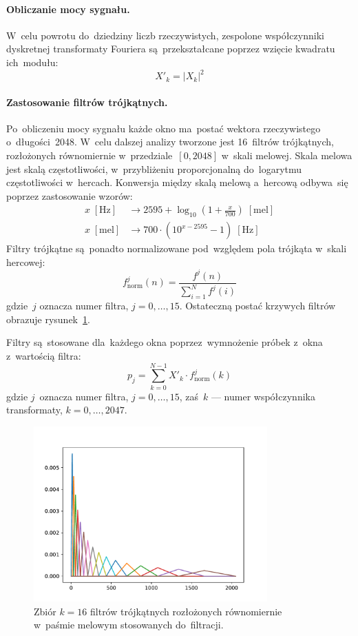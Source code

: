 \documentclass[11pt,a4paper]{article}
\begin{document}
\paragraph{Obliczanie mocy sygnału.}
W~celu powrotu do~dziedziny liczb rzeczywistych, zespolone współczynniki dyskretnej transformaty Fouriera są~przekształcane poprzez wzięcie kwadratu ich~modułu:
$$ X'_k = |X_k|^2 $$

\paragraph{Zastosowanie filtrów trójkątnych.}
Po~obliczeniu mocy sygnału każde okno ma~postać wektora rzeczywistego o~długości~2048.
W~celu dalszej analizy tworzone jest 16~filtrów trójkątnych, rozłożonych równomiernie w~przedziale~$[0,2048]$ w~skali melowej.
Skala melowa jest skalą częstotliwości, w~przybliżeniu proporcjonalną do~logarytmu częstotliwości w~hercach.
Konwersja między skalą melową a~hercową odbywa~się poprzez zastosowanie wzorów:
\begin{align*}
    x \; [\text{Hz}] &\rightarrow 2595 + \log_{10} \left( 1 + \frac{x}{700} \right) \; [\text{mel}] \\
    x \; [\text{mel}] &\rightarrow 700 \cdot \left( 10^{x - 2595} - 1 \right) \; [\text{Hz}]
\end{align*}
Filtry trójkątne są~ponadto normalizowane pod~względem pola trójkąta w~skali hercowej:
$$ f^j_\text{norm}(n) = \frac{f^j(n)}{\sum_{i=1}^{N} f^j(i)} $$
gdzie~$j$ oznacza numer filtra, $j = 0, \dots, 15$.
Ostateczną postać krzywych filtrów obrazuje rysunek~\ref{fig:filtering}.

Filtry są~stosowane dla~każdego okna poprzez~wymnożenie próbek z~okna z~wartością filtra:
$$ p_j = \sum_{k=0}^{N - 1} X'_k \cdot f^j_\text{norm}(k) $$ 
gdzie $j$~oznacza numer filtra, $j = 0, \dots, 15$, zaś~$k$ --- numer współczynnika transformaty, $k = 0, \dots, 2047$.

\begin{figure}
    \centering
    \includegraphics[width=0.8\textwidth]{res/plots/filters.pdf}
    \caption{Zbiór $k = 16$ filtrów trójkątnych rozłożonych równomiernie w~paśmie melowym stosowanych do~filtracji.}
    \label{fig:filtering}
\end{figure}
\end{document}
